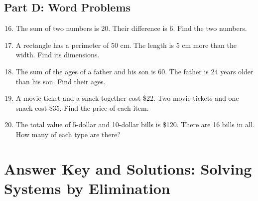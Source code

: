 \documentclass[14pt]{extarticle}
\begin{document}
\subsection*{Part D: Word Problems}
\begin{enumerate}
    \setcounter{enumi}{15}
    \item The sum of two numbers is 20. Their difference is 6. Find the two numbers.
    \item A rectangle has a perimeter of 50 cm. The length is 5 cm more than the width. Find its dimensions.
    \item The sum of the ages of a father and his son is 60. The father is 24 years older than his son. Find their ages.
    \item A movie ticket and a snack together cost \$22. Two movie tickets and one snack cost \$35. Find the price of each item.
    \item The total value of 5-dollar and 10-dollar bills is \$120. There are 16 bills in all. How many of each type are there?
\end{enumerate}


\section*{Answer Key and Solutions: Solving Systems by Elimination}
\end{document}
